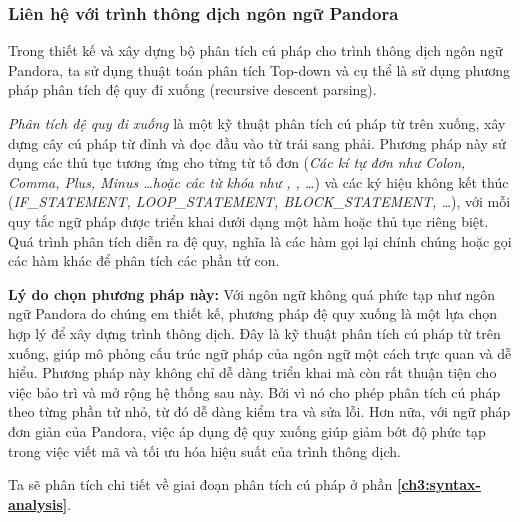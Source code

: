 \subsubsection{Liên hệ với trình thông dịch ngôn ngữ Pandora}
    Trong thiết kế và xây dựng bộ phân tích cú pháp cho trình thông dịch ngôn ngữ Pandora, ta sử dụng thuật toán phân tích Top-down và cụ thể là sử dụng phương pháp phân tích đệ quy đi xuống (recursive descent parsing).

    \textit{Phân tích đệ quy đi xuống} là một kỹ thuật phân tích cú pháp từ trên xuống, xây dựng cây cú pháp từ đỉnh và đọc đầu vào từ trái sang phải. Phương pháp này sử dụng các thủ tục tương ứng cho từng từ tố đơn (\textit{\emph{Các kí tự đơn như} Colon, Comma, Plus, Minus \dots \emph{hoặc các từ khóa như} , , \dots }) và các ký hiệu không kết thúc (\textit{IF\_STATEMENT, LOOP\_STATEMENT, BLOCK\_STATEMENT, \dots}), với mỗi quy tắc ngữ pháp được triển khai dưới dạng một hàm hoặc thủ tục riêng biệt. Quá trình phân tích diễn ra đệ quy, nghĩa là các hàm gọi lại chính chúng hoặc gọi các hàm khác để phân tích các phần tử con.

    \textbf{Lý do chọn phương pháp này:} Với ngôn ngữ không quá phức tạp như ngôn ngữ Pandora do chúng em thiết kế, phương pháp đệ quy xuống là một lựa chọn hợp lý để xây dựng trình thông dịch. Đây là kỹ thuật phân tích cú pháp từ trên xuống, giúp mô phỏng cấu trúc ngữ pháp của ngôn ngữ một cách trực quan và dễ hiểu. Phương pháp này không chỉ dễ dàng triển khai mà còn rất thuận tiện cho việc bảo trì và mở rộng hệ thống sau này. Bởi vì nó cho phép phân tích cú pháp theo từng phần tử nhỏ, từ đó dễ dàng kiểm tra và sửa lỗi. Hơn nữa, với ngữ pháp đơn giản của Pandora, việc áp dụng đệ quy xuống giúp giảm bớt độ phức tạp trong việc viết mã và tối ưu hóa hiệu suất của trình thông dịch.

    Ta sẽ phân tích chi tiết về giai đoạn phân tích cú pháp ở phần \textbf{\ref{ch3:syntax-analysis}}.
